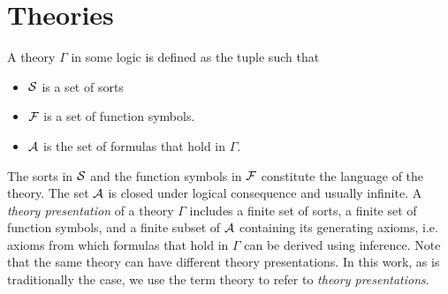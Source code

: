 %


\section{Theories}
\label{sec:background:theory}
A theory $\Gamma$ in some logic is defined as the tuple \lstmath{($\sort$,$\fsyms$,$\axioms$)} such that 
\begin{itemize}
\item $\sort$ is a set of sorts 
\item $\fsyms$ is a set of function symbols. 
\item $\axioms$ is the set of formulas that hold in $\Gamma$. 
\end{itemize}
The sorts in $\sort$ and the function symbols in $\fsyms$ constitute the language of the theory. 
The set $\axioms$ is closed under logical consequence and usually infinite. 
A \emph{theory presentation} of a theory $\Gamma$ includes a finite set of sorts, a finite set of function symbols, and a finite subset of $\axioms$ containing its generating axioms, i.e. axioms from which formulas that hold in $\Gamma$ can be derived using inference. 
Note that the same theory can have different theory presentations. 
In this work, as is traditionally the case, we use the term theory to refer to \emph{theory presentations}. 

